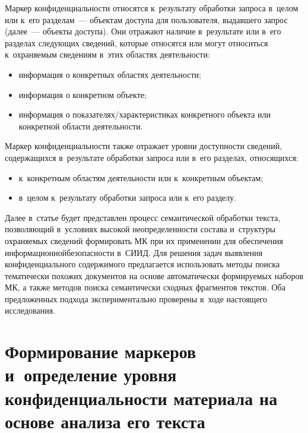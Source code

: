 \begin{multicols}{2}
  Маркер конфиденциальности  относятся к~результату обработки запроса 
  в~целом или к~его разделам~--- объектам доступа для пользователя, выдавшего 
запрос (далее~--- объекты доступа). Они отражают наличие в~результате или 
в~его разделах следующих сведений, которые относятся или могут относиться 
к~охраняемым сведениям в~этих областях деятельности:
  \begin{itemize}
\item информация о конкретных областях деятельности;
\item информация о конкретном объекте;
\item информация о показателях/характеристиках конкретного объекта или 
конкретной области деятельности.
  \end{itemize}
  
  Маркер конфиденциальности также отражает уровни доступности 
сведений, содержащихся в~результате обработки запроса или в~его разделах, 
относящихся:
  \begin{itemize}
  \item к~конкретным областям деятельности или к~конкретным объектам;
\item в~целом к~результату обработки запроса или к~его разделу.
\end{itemize}

  Далее в~статье будет представлен процесс семантической обработки текста, 
позволяющий в~условиях высокой неопределенности состава и~структуры 
охраняемых сведений формировать МК при их 
применении для обеспечения информационной\linebreak безопас\-ности в~СИИД.
 Для решения задач выявления 
конфиденциального содержимого пред\-ла\-га\-ется использовать методы поиска 
тематически похожих документов на основе автоматически формируемых 
наборов МК, а также методов поиска семантически сходных фрагментов 
текстов. Оба предложенных подхода экспериментально проверены в~ходе 
настоящего исследования. 

\section{Формирование маркеров и~определение уровня 
конфиденциальности материала на основе анализа его текста} %
     

\end{multicols}
